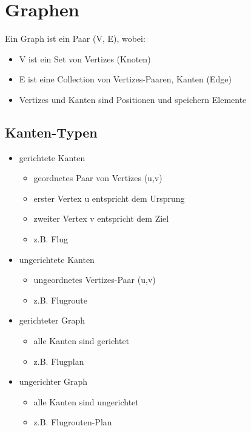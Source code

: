 \section{Graphen}
Ein Graph ist ein Paar (V, E), wobei:
\begin{itemize}
    \item V ist ein Set von Vertizes (Knoten)
    \item E ist eine Collection von Vertizes-Paaren, Kanten (Edge)
    \item Vertizes und Kanten sind Positionen und speichern Elemente
\end{itemize}

\subsection{Kanten-Typen}
\begin{itemize}
    \item gerichtete Kanten
    \begin{itemize}
        \item geordnetes Paar von Vertizes (u,v)
        \item erster Vertex u entspricht dem Ursprung
        \item zweiter Vertex v entspricht dem Ziel
        \item z.B. Flug
    \end{itemize}
    \item ungerichtete Kanten
    \begin{itemize}
        \item ungeordnetes Vertizes-Paar (u,v)
        \item z.B. Flugroute
    \end{itemize}
    \item gerichteter Graph
    \begin{itemize}
        \item alle Kanten sind gerichtet
        \item z.B. Flugplan
    \end{itemize}
    \item ungerichter Graph
    \begin{itemize}
        \item alle Kanten sind ungerichtet
        \item z.B. Flugrouten-Plan
    \end{itemize}
\end{itemize}


